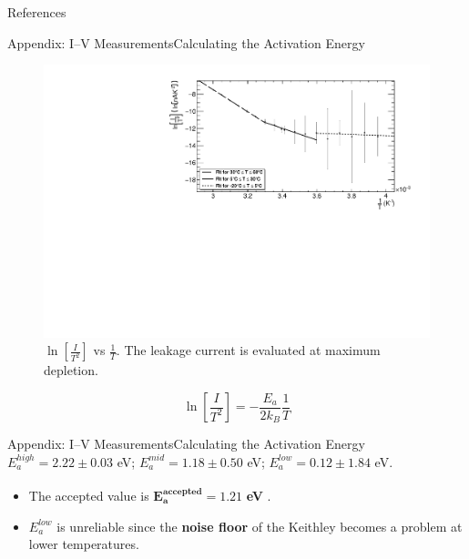 \documentclass{beamer}
\begin{document}
    \begin{frame}{References}
        \printbibliography
    \end{frame}
    
    \begin{frame}{Appendix: I--V Measurements}{Calculating the Activation Energy}
        \begin{figure}
            \centering
            \includegraphics[width = 0.8\linewidth]{BandGap_fullrange_BlackandWhite_3101.pdf}
            \caption{$\ln \left[{\frac{I}{T^2}}\right]$ vs $\frac{1}{T}$. The leakage current is evaluated at maximum depletion.}
            \label{fig:BandGapFull}
        \end{figure}
        \vspace{-0.5cm}
        \begin{equation*}
            \ln \left[{\frac{I}{T^2}}\right] = -\frac{E_a}{2k_B}\frac{1}{T}
        \end{equation*}
    \end{frame}
    
    \begin{frame}{Appendix: I--V Measurements}{Calculating the Activation Energy}
        {\small $E_a^{high} = 2.22 \pm 0.03$ eV; $E_a^{mid} = 1.18 \pm 0.50$ eV; $E_a^{low} = 0.12 \pm 1.84$ eV.}
        \vspace{0.5cm}
        \begin{itemize}   
            \item The accepted value is $\bm{E_a^{accepted} = 1.21}$ \textbf{eV} \textsuperscript{\cite{BandGap}}.
            \vspace{0.5cm}
            \item $E_a^{low}$ is unreliable since the \textbf{noise floor} of the Keithley becomes a problem at lower temperatures.
        \end{itemize}
    \end{frame}
    
\end{document}
